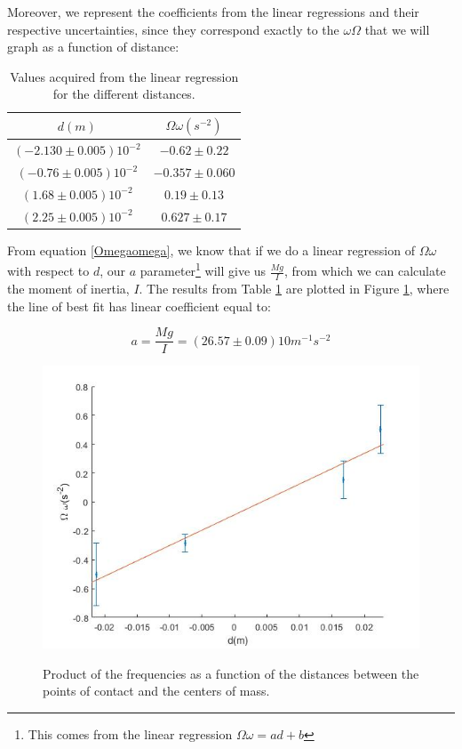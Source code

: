 \documentclass[a4paper,12pt]{article}
\begin{document}
Moreover, we represent the coefficients from the linear regressions and their respective uncertainties, since they correspond exactly to the $\omega \Omega$ that we will graph as a function of distance:

\begin{table}[H]
	\centering
  \caption{Values acquired from the linear regression for the different distances.}
  \begin{tabular}{|c|c|}
    \hline
    $d(m)$ & $\Omega \omega (s^{-2})$\\
        \hline
    $(-2.130 \pm 0.005) 10^{-2}$  & $-0.62 \pm 0.22$ \\
    \hline
    $(-0.76 \pm 0.005) 10^{-2}$ & $-0.357 \pm 0.060$ \\
    \hline
    $(1.68 \pm 0.005)10^{-2 }$ & $0.19 \pm 0.13$\\
    \hline
    $(2.25 \pm 0.005)10^{-2}$ & $0.627 \pm 0.17$\\
    \hline
  \end{tabular}
  \label{tabl:Omom}
\end{table}

From equation \eqref{Omegaomega}, we know that if we do a linear regression of $\Omega \omega$ with respect to $d$, our $a$ parameter\footnote{This comes from the linear regression  $\Omega \omega = a d + b$} will give us $\frac{Mg}{I}$, from which we can calculate the moment of inertia, $I$. The results from Table \ref{tabl:Omom} are plotted in Figure \ref{foda2}, where the line of best fit has linear coefficient equal to:

\begin{equation}
  \label{result1}
  a = \frac{Mg}{I} = (26.57 \pm 0.09)10 m^{-1}s^{-2}
\end{equation}

\begin{figure}
	\caption{Product of the frequencies as a function of the distances between the points of contact and the centers of mass.}
	\includegraphics[width=\textwidth]{part2.jpg}
	\label{foda2}
\end{figure} 
\end{document}
